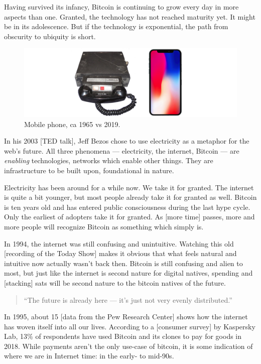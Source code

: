 Having survived its infancy, Bitcoin is continuing to grow every day in
more aspects than one. Granted, the technology has not reached maturity
yet. It might be in its adolescence. But if the technology is
exponential, the path from obscurity to ubiquity is short.

\begin{figure}
  \includegraphics{assets/images/mobile-phone.png}
  \caption{Mobile phone, ca 1965 vs 2019.}
  \label{fig:mobile-phone}
\end{figure}

In his 2003 [TED talk], Jeff Bezos chose to use electricity as a
metaphor for the web's future. All three phenomena --- electricity, the
internet, Bitcoin --- are \textit{enabling} technologies, networks which enable
other things. They are infrastructure to be built upon, foundational in
nature.

Electricity has been around for a while now. We take it for granted. The
internet is quite a bit younger, but most people already take it for
granted as well. Bitcoin is ten years old and has entered public
consciousness during the last hype cycle. Only the earliest of adopters
take it for granted. As [more time] passes, more and more people will
recognize Bitcoin as something which simply is.

In 1994, the internet was still confusing and unintuitive. Watching this
old [recording of the Today Show] makes it obvious that what feels
natural and intuitive now actually wasn't back then. Bitcoin is still
confusing and alien to most, but just like the internet is second nature
for digital natives, spending and [stacking] sats will be second nature
to the bitcoin natives of the future.

\begin{quotation}
``The future is already here --- it's just not very evenly
distributed.''
\end{quotation}

In 1995, about 15%
[data from the Pew Research Center] shows how the internet has woven
itself into all our lives. According to a [consumer survey] by Kaspersky
Lab, 13\% of respondents have used Bitcoin and its clones to pay for
goods in 2018. While payments aren't the only use-case of bitcoin, it is
some indication of where we are in Internet time: in the early- to
mid-90s.

